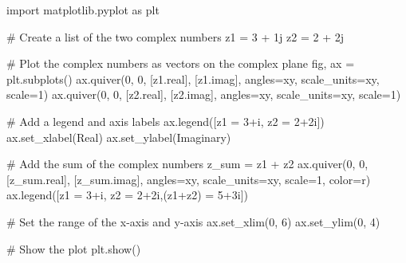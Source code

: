 \documentclass[
  letterpaper,
  DIV=11,
  numbers=noendperiod]{scrartcl}
\newenvironment{Shaded}{\begin{snugshade}}{\end{snugshade}}
\newcommand{\CommentTok}[1]{\textcolor[rgb]{0.37,0.37,0.37}{#1}}
\newcommand{\DecValTok}[1]{\textcolor[rgb]{0.68,0.00,0.00}{#1}}
\newcommand{\ImportTok}[1]{\textcolor[rgb]{0.00,0.46,0.62}{#1}}
\newcommand{\NormalTok}[1]{\textcolor[rgb]{0.00,0.23,0.31}{#1}}
\newcommand{\OperatorTok}[1]{\textcolor[rgb]{0.37,0.37,0.37}{#1}}
\newcommand{\OtherTok}[1]{\textcolor[rgb]{0.00,0.23,0.31}{#1}}
\newcommand{\StringTok}[1]{\textcolor[rgb]{0.13,0.47,0.30}{#1}}
\begin{document}
\begin{Shaded}
\begin{Highlighting}[numbers=left,,]
\ImportTok{import}\NormalTok{ matplotlib.pyplot }\ImportTok{as}\NormalTok{ plt}

\CommentTok{\# Create a list of the two complex numbers}
\NormalTok{z1 }\OperatorTok{=} \DecValTok{3} \OperatorTok{+} \OtherTok{1j}
\NormalTok{z2 }\OperatorTok{=} \DecValTok{2} \OperatorTok{+} \OtherTok{2j}

\CommentTok{\# Plot the complex numbers as vectors on the complex plane}
\NormalTok{fig, ax }\OperatorTok{=}\NormalTok{ plt.subplots()}
\NormalTok{ax.quiver(}\DecValTok{0}\NormalTok{, }\DecValTok{0}\NormalTok{, [z1.real], [z1.imag], angles}\OperatorTok{=}\StringTok{\textquotesingle{}xy\textquotesingle{}}\NormalTok{, scale\_units}\OperatorTok{=}\StringTok{\textquotesingle{}xy\textquotesingle{}}\NormalTok{, scale}\OperatorTok{=}\DecValTok{1}\NormalTok{)}
\NormalTok{ax.quiver(}\DecValTok{0}\NormalTok{, }\DecValTok{0}\NormalTok{, [z2.real], [z2.imag], angles}\OperatorTok{=}\StringTok{\textquotesingle{}xy\textquotesingle{}}\NormalTok{, scale\_units}\OperatorTok{=}\StringTok{\textquotesingle{}xy\textquotesingle{}}\NormalTok{, scale}\OperatorTok{=}\DecValTok{1}\NormalTok{)}

\CommentTok{\# Add a legend and axis labels}
\NormalTok{ax.legend([}\StringTok{\textquotesingle{}z1 = 3+i\textquotesingle{}}\NormalTok{, }\StringTok{\textquotesingle{}z2 = 2+2i\textquotesingle{}}\NormalTok{])}
\NormalTok{ax.set\_xlabel(}\StringTok{\textquotesingle{}Real\textquotesingle{}}\NormalTok{)}
\NormalTok{ax.set\_ylabel(}\StringTok{\textquotesingle{}Imaginary\textquotesingle{}}\NormalTok{)}

\CommentTok{\# Add the sum of the complex numbers}
\NormalTok{z\_sum }\OperatorTok{=}\NormalTok{ z1 }\OperatorTok{+}\NormalTok{ z2}
\NormalTok{ax.quiver(}\DecValTok{0}\NormalTok{, }\DecValTok{0}\NormalTok{, [z\_sum.real], [z\_sum.imag], angles}\OperatorTok{=}\StringTok{\textquotesingle{}xy\textquotesingle{}}\NormalTok{, scale\_units}\OperatorTok{=}\StringTok{\textquotesingle{}xy\textquotesingle{}}\NormalTok{, scale}\OperatorTok{=}\DecValTok{1}\NormalTok{, color}\OperatorTok{=}\StringTok{\textquotesingle{}r\textquotesingle{}}\NormalTok{)}
\NormalTok{ax.legend([}\StringTok{\textquotesingle{}z1 = 3+i\textquotesingle{}}\NormalTok{, }\StringTok{\textquotesingle{}z2 = 2+2i\textquotesingle{}}\NormalTok{,}\StringTok{\textquotesingle{}(z1+z2) = 5+3i\textquotesingle{}}\NormalTok{])}

\CommentTok{\# Set the range of the x{-}axis and y{-}axis}
\NormalTok{ax.set\_xlim(}\DecValTok{0}\NormalTok{, }\DecValTok{6}\NormalTok{)}
\NormalTok{ax.set\_ylim(}\DecValTok{0}\NormalTok{, }\DecValTok{4}\NormalTok{)}

\CommentTok{\# Show the plot}
\NormalTok{plt.show()}
\end{Highlighting}
\end{Shaded}
\end{document}
